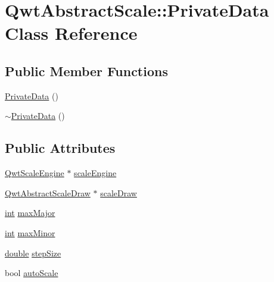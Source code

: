 \hypertarget{class_qwt_abstract_scale_1_1_private_data}{\section{Qwt\-Abstract\-Scale\-:\-:Private\-Data Class Reference}
\label{class_qwt_abstract_scale_1_1_private_data}
}
\subsection*{Public Member Functions}
\begin{DoxyCompactItemize}
\item 
\hyperlink{class_qwt_abstract_scale_1_1_private_data_a55b63765f69f83ff05fa97941c0a7f68}{Private\-Data} ()
\item 
\hyperlink{class_qwt_abstract_scale_1_1_private_data_a84ee6527008b8fb9680dfa501a4ed056}{$\sim$\-Private\-Data} ()
\end{DoxyCompactItemize}
\subsection*{Public Attributes}
\begin{DoxyCompactItemize}
\item 
\hyperlink{class_qwt_scale_engine}{Qwt\-Scale\-Engine} $\ast$ \hyperlink{class_qwt_abstract_scale_1_1_private_data_a27c6d6056bb7217c16dea852430b6d27}{scale\-Engine}
\item 
\hyperlink{class_qwt_abstract_scale_draw}{Qwt\-Abstract\-Scale\-Draw} $\ast$ \hyperlink{class_qwt_abstract_scale_1_1_private_data_aa639778c788fc3096dc99663557f1e16}{scale\-Draw}
\item 
\hyperlink{ioapi_8h_a787fa3cf048117ba7123753c1e74fcd6}{int} \hyperlink{class_qwt_abstract_scale_1_1_private_data_a59e160f9663c1f57b216f9ae48f7f52e}{max\-Major}
\item 
\hyperlink{ioapi_8h_a787fa3cf048117ba7123753c1e74fcd6}{int} \hyperlink{class_qwt_abstract_scale_1_1_private_data_a2d1f472599c7aaaf5a2410167b8dcc0d}{max\-Minor}
\item 
\hyperlink{_super_l_u_support_8h_a8956b2b9f49bf918deed98379d159ca7}{double} \hyperlink{class_qwt_abstract_scale_1_1_private_data_ad89176710ff5ac79829efaaf1909d893}{step\-Size}
\item 
bool \hyperlink{class_qwt_abstract_scale_1_1_private_data_a1e95dca20554e3a6cb051871130994e8}{auto\-Scale}
\end{DoxyCompactItemize}


